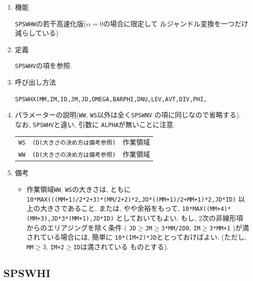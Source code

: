 \documentclass[a4j,fleqn]{jarticle}
\begin{document}
\begin{enumerate}

\item 機能

{\tt SPSWHW}の若干高速化版($\alpha=0$の場合に限定して
ルジャンドル変換を一つだけ減らしている)

\item 定義

{\tt SPSWHV}の項を参照.

\item 呼び出し方法 

{\tt SPSWHX(MM,IM,ID,JM,JD,OMEGA,BARPHI,DNU,LEV,AVT,DIV,PHI,}\\
\hspace*{10em}{\tt DAVT,DDIV,DPHI,RN,IRM,IT,T,Y,IP,P,R,IA,A,Q,WS,WW)}

\item パラメーターの説明({\tt WW}, {\tt WS}以外は全く{\tt SPSWNV}
の項に同じなので省略する). なお, {\tt SPSWHV}と違い, 引数に
{\tt ALPHA}が無いことに注意.

\begin{tabular}{lll}
{\tt WS}  & {\tt (D(大きさの決め方は備考参照)} & 作業領域\\
{\tt WW}  & {\tt (D(大きさの決め方は備考参照)} & 作業領域
\end{tabular}

\item 備考

\begin{itemize}

\item 作業領域{\tt WW}, {\tt WS}の大きさは, ともに\\
     {\tt 10*MAX(((MM+1)/2*2+3)*(MM/2+2)*2,JD*((MM+1)/2+MM+1)*2,JD*ID)}
    以上の大きさであること. または, やや余裕をもって,
     {\tt 10*MAX((MM+4)*(MM+3),JD*3*(MM+1),JD*ID)}
    としておいてもよい. もし, 2次の非線形項からのエリアジングを除く条件
     ( {\tt JD}$\ge${\tt JM}$\ge${\tt 3*MM/2D0}, 
      {\tt IM}$\ge${\tt 3*MM+1} )が満されている場合には, 簡単に
      {\tt 10*(IM+2)*JD}ととっておけばよい.
     (ただし, {\tt MM}$\ge 3$, {\tt IM+2}$\ge${\tt ID}は満されている
    ものとする).

\end{itemize}

\end{enumerate}

\subsection{SPSWHI}
\end{document}
